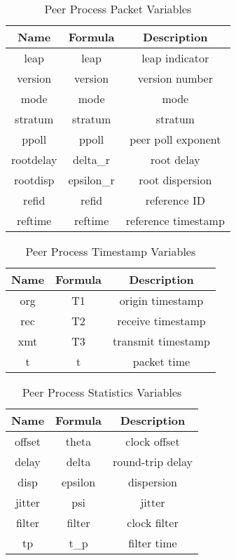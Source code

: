 \begin{table}[htb]
\center
\begin{tabular}{c | c | c}
Name & Formula & Description \\
\hline
\hline
leap & leap & leap indicator \\
version & version & version number \\
mode & mode & mode \\
stratum & stratum & stratum \\
ppoll & ppoll & peer poll exponent \\
rootdelay & delta\_r & root delay \\
rootdisp & epsilon\_r & root dispersion \\
refid & refid & reference ID \\
reftime & reftime & reference timestamp \\
\hline
\end{tabular}
\label{peer_process_packet_variables}
\caption{Peer Process Packet Variables}
\end{table}

\begin{table}[htb]
\center
\begin{tabular}{c | c | c}
Name & Formula & Description \\
\hline
\hline
org & T1 & origin timestamp \\
rec & T2 & receive timestamp \\
xmt & T3 & transmit timestamp \\
t & t & packet time \\
\hline
\end{tabular}
\label{peer_process_timestamp_variables}
\caption{Peer Process Timestamp Variables}
\end{table}

\begin{table}[htb]
\center
\begin{tabular}{c | c | c}
Name & Formula & Description \\
\hline
\hline
offset & theta & clock offset \\
delay & delta & round-trip delay\\
disp & epsilon & dispersion \\
jitter & psi & jitter \\
filter & filter & clock filter \\
tp & t\_p & filter time \\
\hline
\end{tabular}
\label{peer_process_statistics_variables}
\caption{Peer Process Statistics Variables}
\end{table}


